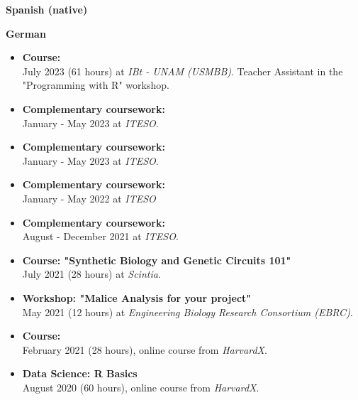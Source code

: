 \documentclass{simplecv}
\begin{document}
\newpage
\setlength\columnsep{0.33in}
\begin{multicols}{2}
\vspace{-8pt}
\textbf{Spanish (native)}\\

\medskip

\textbf{German}\\

\bigskip

\vspace{-8pt}
{\small
  \begin{itemize}[leftmargin=*]
  \setlength{\itemsep}{6pt}
    \item \textbf{Course: }\\July 2023 (61 hours) at \textit{IBt - UNAM (USMBB)}. Teacher Assistant in the "Programming with R" workshop.
    \item \textbf{Complementary coursework: }\\January - May 2023 at \textit{ITESO}.
    \item \textbf{Complementary coursework: }\\January - May 2023 at \textit{ITESO}.
    \item \textbf{Complementary coursework:  }\\January - May 2022 at \textit{ITESO}
    \item \textbf{Complementary coursework: }\\August - December 2021 at \textit{ITESO}.
    \item \textbf{Course: "Synthetic Biology and Genetic Circuits 101"}\\July 2021 (28 hours) at \textit{Scintia}.
    \item \textbf{Workshop: "Malice Analysis for your project"}\\May 2021 (12 hours) at \textit{Engineering Biology Research Consortium (EBRC)}.
    \item \textbf{Course: }\\February 2021 (28 hours), online course from \textit{HarvardX}.
    \item \textbf{Data Science: R Basics}\\August 2020 (60 hours), online course from \textit{HarvardX}.
  \end{itemize}
}


\end{multicols}
\end{document}
